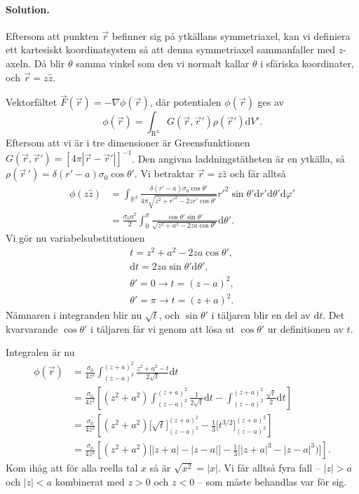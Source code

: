 \documentclass[%
oneside,                 %
final,                   %
10pt]{article}
\newenvironment{doconceexercise}{}{}
\begin{document}
\begin{doconceexercise}


\paragraph{Solution.}
Eftersom att punkten $\vec r$ befinner sig på ytkällans symmetriaxel, kan vi definiera ett kartesiskt koordinatsystem så att denna symmetriaxel sammanfaller med $z$-axeln. Då blir $\theta$ samma vinkel som den vi normalt kallar $\theta$ i sfäriska koordinater, och $\vec r=z\hat z$.

Vektorfältet $\vec F(\vec r)=-\nabla\phi(\vec r)$, där potentialen $\phi(\vec r)$ ges av
\begin{equation}
    \phi(\vec r)=\int_{\mathrm R^3}G(\vec r,\vec r')\rho(\vec r')\mathrm dV'.
\end{equation}
Eftersom att vi är i tre dimensioner är Greensfunktionen $G(\vec r,\vec r')=[4\pi|\vec r-\vec r'|]^{-1}$. Den angivna laddningstätheten är en ytkälla, så $\rho(\vec r\,')=\delta(r'-a)\sigma_0\cos\theta'$. Vi betraktar $\vec{r} = z\hat{z}$ och får alltså 
\begin{align}
    \phi(z\hat z)&=\int_{\mathbb R^3}\frac{\delta(r'-a)\sigma_0\cos\theta'}{4\pi\sqrt{z^2+r'^2-2zr'\cos\theta'}}r'^2\sin\theta'\mathrm dr'\mathrm d\theta'\mathrm d\varphi'\\
    &=\frac{\sigma_0a^2}2\int_0^\pi \frac{\cos\theta'\sin\theta'}{\sqrt{z^2+a^2-2za\cos\theta'}}\mathrm d\theta'.
\end{align}
Vi gör nu variabelsubstitutionen 
\begin{gather}
t=z^2+a^2-2za\cos\theta',\nonumber\\
\mathrm dt=2za\sin\theta'\mathrm d\theta',\nonumber\\
\theta'=0\to t=(z-a)^2,\nonumber\\
\theta'=\pi\to t=(z+a)^2.
\end{gather}
Nämnaren i integranden blir nu $\sqrt t$, och $\sin\theta'$ i täljaren blir en del av $\mathrm dt$. Det kvarvarande $\cos\theta'$ i täljaren får vi genom att lösa ut $\cos\theta'$ ur definitionen av $t$. 

Integralen är nu
\begin{align}
    \phi(\vec r)&=\frac{\sigma_0}{4z^2}\int_{(z-a)^2}^{(z+a)^2} \frac{z^2+a^2-t}{2\sqrt t}\mathrm dt\\
    &=\frac{\sigma_0}{4z^2}\left[(z^2+a^2)\int_{(z-a)^2}^{(z+a)^2} \frac1{2\sqrt t}\mathrm dt-\int_{(z-a)^2}^{(z+a)^2} \frac{\sqrt t}2\mathrm dt\right]\\
    &=\frac{\sigma_0}{4z^2}\left[(z^2+a^2)\Big[\sqrt t\Big]_{(z-a)^2}^{(z+a)^2} -\frac13\Big[t^{3/2}\Big]_{(z-a)^2}^{(z+a)^2}\right]\\
    &=\frac{\sigma_0}{4z^2}\left[(z^2+a^2)\Big[|z+a|-|z-a|\Big]-\frac13\Big[|z+a|^3-|z-a|^3)\Big]\right].
\label{phi}
\end{align}
Kom ihåg att för alla reella tal $x$ så är $\sqrt{x^2}=|x|$. Vi får alltså fyra fall -- $|z|>a$ och $|z|<a$ kombinerat med $z>0$ och $z<0$ -- som måste behandlas var för sig. 


\end{doconceexercise}
\end{document}
